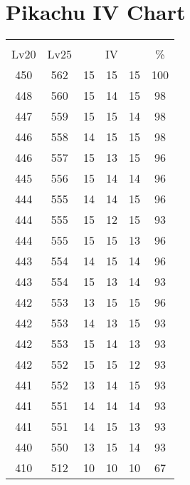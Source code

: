 \documentclass{article}%
\begin{document}
%
\normalsize%
\section{Pikachu IV Chart}%
\label{sec:Pikachu IV Chart}%
\renewcommand{\arraystretch}{1.5}%
\begin{tabular}{|c|c|c|c|c|c|}%
\hline%
\multicolumn{6}{|c|}{\textcolor{white}{ 
\linebreak{Pikachu}
}%
\cellcolor{black}}\\%
\multicolumn{1}{|c}{Lv20}&\multicolumn{1}{c|}{Lv25}&\multicolumn{3}{c|}{IV}&\multicolumn{1}{|c|}{\%}\\%
\hline%
\rowcolor{color100}%
450&562&15&15&15&100\\%
\hline%
\rowcolor{color98}%
448&560&15&14&15&98\\%
\hline%
\rowcolor{color98}%
447&559&15&15&14&98\\%
\hline%
\rowcolor{color98}%
446&558&14&15&15&98\\%
\hline%
\rowcolor{color96}%
446&557&15&13&15&96\\%
\hline%
\rowcolor{color96}%
445&556&15&14&14&96\\%
\hline%
\rowcolor{color96}%
444&555&14&14&15&96\\%
\hline%
\rowcolor{color93}%
444&555&15&12&15&93\\%
\hline%
\rowcolor{color96}%
444&555&15&15&13&96\\%
\hline%
\rowcolor{color96}%
443&554&14&15&14&96\\%
\hline%
\rowcolor{color93}%
443&554&15&13&14&93\\%
\hline%
\rowcolor{color96}%
442&553&13&15&15&96\\%
\hline%
\rowcolor{color93}%
442&553&14&13&15&93\\%
\hline%
\rowcolor{color93}%
442&553&15&14&13&93\\%
\hline%
\rowcolor{color93}%
442&552&15&15&12&93\\%
\hline%
\rowcolor{color93}%
441&552&13&14&15&93\\%
\hline%
\rowcolor{color93}%
441&551&14&14&14&93\\%
\hline%
\rowcolor{color93}%
441&551&14&15&13&93\\%
\hline%
\rowcolor{color93}%
440&550&13&15&14&93\\%
\hline%
\rowcolor{color91}%
410&512&10&10&10&67\\%
\end{tabular}

%
\end{document}
